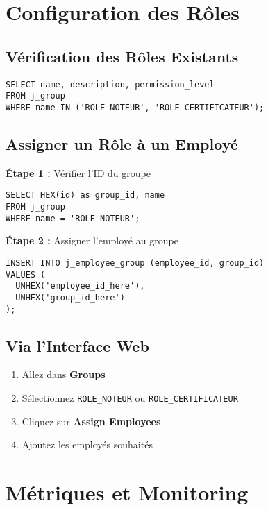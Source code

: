 \documentclass[11pt,a4paper]{article}
\begin{document}
    \section{Configuration des Rôles}

    \subsection{Vérification des Rôles Existants}

    \begin{lstlisting}[style=sqlstyle]
SELECT name, description, permission_level
FROM j_group
WHERE name IN ('ROLE_NOTEUR', 'ROLE_CERTIFICATEUR');
    \end{lstlisting}

    \subsection{Assigner un Rôle à un Employé}

    \textbf{Étape 1 :} Vérifier l'ID du groupe

    \begin{lstlisting}[style=sqlstyle]
SELECT HEX(id) as group_id, name
FROM j_group
WHERE name = 'ROLE_NOTEUR';
    \end{lstlisting}

    \textbf{Étape 2 :} Assigner l'employé au groupe

    \begin{lstlisting}[style=sqlstyle]
INSERT INTO j_employee_group (employee_id, group_id)
VALUES (
  UNHEX('employee_id_here'),
  UNHEX('group_id_here')
);
    \end{lstlisting}

    \subsection{Via l'Interface Web}

    \begin{enumerate}
        \item Allez dans \textbf{Groups}
        \item Sélectionnez \texttt{ROLE\_NOTEUR} ou \texttt{ROLE\_CERTIFICATEUR}
        \item Cliquez sur \textbf{Assign Employees}
        \item Ajoutez les employés souhaités
    \end{enumerate}

    \section{Métriques et Monitoring}
\end{document}
